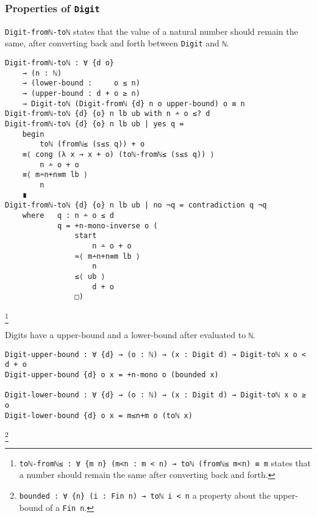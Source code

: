 \documentclass[\main/thesis.tex]{subfiles}
\begin{document}
\subsubsection{Properties of \lstinline|Digit|}

\begin{center}
\end{center}

{\lstinline|Digit-fromℕ-toℕ|} states that the value of a natural number should
remain the same, after converting back and forth between {\lstinline|Digit|} and
{\lstinline|ℕ|}.

\begin{lstlisting}
Digit-fromℕ-toℕ : ∀ {d o}
    → (n : ℕ)
    → (lower-bound :     o ≤ n)
    → (upper-bound : d + o ≥ n)
    → Digit-toℕ (Digit-fromℕ {d} n o upper-bound) o ≡ n
Digit-fromℕ-toℕ {d} {o} n lb ub with n ∸ o ≤? d
Digit-fromℕ-toℕ {d} {o} n lb ub | yes q =
    begin
        toℕ (fromℕ≤ (s≤s q)) + o
    ≡⟨ cong (λ x → x + o) (toℕ-fromℕ≤ (s≤s q)) ⟩
        n ∸ o + o
    ≡⟨ m∸n+n≡m lb ⟩
        n
    ∎
Digit-fromℕ-toℕ {d} {o} n lb ub | no ¬q = contradiction q ¬q
    where   q : n ∸ o ≤ d
            q = +n-mono-inverse o (
                start
                    n ∸ o + o
                ≈⟨ m∸n+n≡m lb ⟩
                    n
                ≤⟨ ub ⟩
                    d + o
                □)
\end{lstlisting}
\footnote{
    {\lstinline|toℕ-fromℕ≤ : ∀ {m n} (m<n : m < n) → toℕ (fromℕ≤ m<n) ≡ m|}
    \newline\hspace*{4em} states that a number should remain the same after converting back and forth.
}

Digits have a upper-bound and a lower-bound after evaluated to \lstinline|ℕ|.

\begin{lstlisting}[basicstyle=\ttfamily\scriptsize]
Digit-upper-bound : ∀ {d} → (o : ℕ) → (x : Digit d) → Digit-toℕ x o < d + o
Digit-upper-bound {d} o x = +n-mono o (bounded x)

Digit-lower-bound : ∀ {d} → (o : ℕ) → (x : Digit d) → Digit-toℕ x o ≥ o
Digit-lower-bound {d} o x = m≤n+m o (toℕ x)
\end{lstlisting}
\footnote{
    {\lstinline|bounded : ∀ {n} (i : Fin n) → toℕ i < n|}
    \newline\hspace*{4em} a property about the upper-bound of a {\lstinline|Fin n|}.
}
\end{document}
